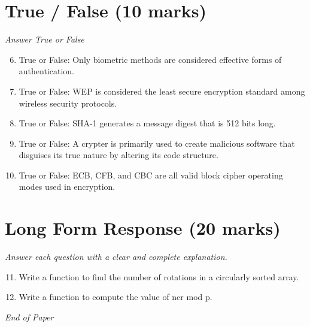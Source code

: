 \documentclass[12pt]{article}
\begin{document}
\section*{True / False (10 marks)}
\textit{Answer True or False}
\begin{enumerate}[label=\arabic*.]
\setcounter{enumi}{5}
\item True or False: Only biometric methods are considered effective forms of authentication.
\item True or False: WEP is considered the least secure encryption standard among wireless security protocols.
\item True or False: SHA-1 generates a message digest that is 512 bits long.
\item True or False: A crypter is primarily used to create malicious software that disguises its true nature by altering its code structure.
\item True or False: ECB, CFB, and CBC are all valid block cipher operating modes used in encryption.
\end{enumerate}

\section*{Long Form Response (20 marks)}
\textit{Answer each question with a clear and complete explanation.}
\begin{enumerate}[label=\arabic*.]
\setcounter{enumi}{10}
\item Write a function to find the number of rotations in a circularly sorted array.
\item Write a function to compute the value of ncr mod p.
\end{enumerate}

\vfill
\noindent\textit{End of Paper}
\end{document}
